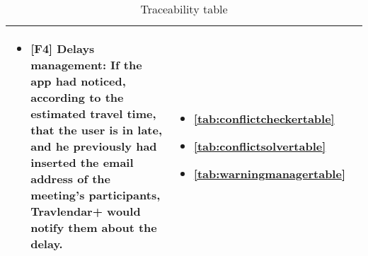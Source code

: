 \begin{flushleft}
\begin{table}[htp]
\begin{tabular}{p{3cm}|p{6cm}|p{2cm}}
\begin{itemize}
	\item \textbf{[\hypertarget{F4}{F4}] Delays management}:  If the app had noticed, according to the estimated travel time, that the user is in late, and he previously had inserted the email address of the meeting’s participants, Travlendar+ would notify them about the delay. 
\end{itemize}&
\begin{itemize}
	\item \autoref{tab:conflictcheckertable}
	
	\item \autoref{tab:conflictsolvertable}
	
	\item \autoref{tab:warningmanagertable}
\end{itemize}\\
\hline


\end{tabular}
\caption{Traceability table } 
\label{tab:traceabilitytable1}
\end{table}

\begin{table}[htp]
	

\end{table}
\end{flushleft}
